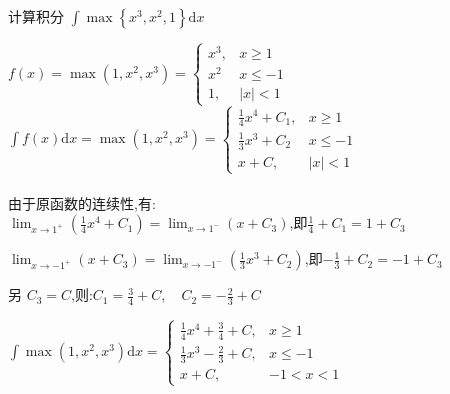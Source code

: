 \begin{xiti}
	\item 计算积分 $\int \max \left\{ x ^ { 3 } , x ^ { 2 } , 1 \right\} \mathrm { d } x$
		\begin{solution}				
				$f(x)=\max \left(1, x^{2}, x^{3}\right)=\left\{\begin{array}{cc}{x^{3},} & {x \geqslant 1} \\ {x^{2}} & {x \leqslant-1} \\ {1,} & {|x|<1}\end{array}\right.$
				\\				
				$\int f(x) \mathrm{d}x=\max \left(1, x^{2}, x^{3}\right)=\left\{\begin{array}{cc}{\frac{1}{4} x^{4}+C_{1},} & {x \geqslant 1} \\ {\frac{1}{3} x^{3}+C_2} & {x \leqslant-1} \\ {x+C,} & {|x|<1}\end{array}\right.$ \\				
				\\由于原函数的连续性,有:\\
				$\lim _{x \rightarrow 1^{+}}\left(\frac{1}{4} x^{4}+C_{1}\right)=\lim _{x \rightarrow 1^{-}}\left(x+C_{3}\right)$,即$\frac{1}{4}+C_{1}=1+C_{3}$
				
				$\lim _{x \rightarrow-1^{+}}\left(x+C_{3}\right)=\lim _{x \rightarrow-1^{-}}\left(\frac{1}{3} x^{3}+C_{2}\right)$,即$-\frac{1}{3}+C_{2}=-1+C_{3}$
				
				另 $C_{3}=C$,则:$C_{1}=\frac{3}{4}+C, \quad C_{2}=-\frac{2}{3}+C$
				
				$\int \max \left(1, x^{2}, x^{3}\right) \mathrm{d} x=\left\{\begin{array}{cc}{\frac{1}{4} x^{4}+\frac{3}{4}+C,} & {x \geqslant 1} \\ {\frac{1}{3} x^{3}-\frac{2}{3}+C,} & {x \leqslant-1} \\ {x+C,} & {-1<x<1}\end{array}\right.$
		

\end{solution}
\end{xiti}
